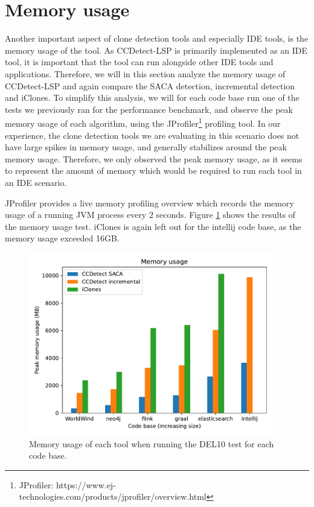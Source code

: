 \vfill
\newpage

\section{Memory usage}

Another important aspect of clone detection tools and especially IDE tools, is the memory
usage of the tool. As CCDetect-LSP is primarily implemented as an IDE tool, it is
important that the tool can run alongside other IDE tools and applications. Therefore, we
will in this section analyze the memory usage of CCDetect-LSP and again compare the SACA
detection, incremental detection and iClones. To simplify this analysis, we will for each
code base run one of the tests we previously ran for the performance benchmark, and
observe the peak memory usage of each algorithm, using the JProfiler\footnote{JProfiler:
https://www.ej-technologies.com/products/jprofiler/overview.html} profiling tool. In our
experience, the clone detection tools we are evaluating in this scenario does not have
large spikes in memory usage, and generally stabilizes around the peak memory usage.
Therefore, we only observed the peak memory usage, as it seems to represent the amount of
memory which would be required to run each tool in an IDE scenario.

JProfiler provides a live memory profiling overview which records the memory usage of a
running JVM process every $2$ seconds. Figure \ref{fig:memoryusage} shows the results of
the memory usage test. iClones is again left out for the intellij code base, as the memory
usage exceeded 16GB.       

\begin{figure}[t]
    \begin{center}
        \includegraphics[width=0.95\textwidth]{figures/memoryusage.pdf}
    \end{center}
    \caption{Memory usage of each tool when running the DEL10 test for each code base.}
    \label{fig:memoryusage}
\end{figure}


